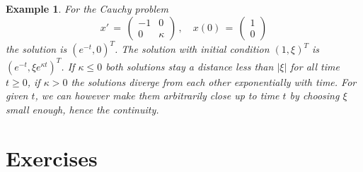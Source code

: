\documentclass[12pt]{report}
\newtheorem{example}[theorem]{Example}
\begin{document}
\begin{example}{\rm For the Cauchy problem  
\begin{equation}
x'\,=\, \left(  \begin{array}{cc}  -1 & 0 \\ 0 & \kappa   \end{array}\right) 
\,, \quad x(0)
\,=\, \left(  \begin{array}{c}  1 \\  0  \end{array}\right)
\end{equation} 
the solution is $(e^{-t}, 0)^T$. The solution with initial condition
$(1,\xi)^T$ is $(e^{-t}, \xi e^{\kappa t})^T$. If $\kappa \le 0$ both
solutions stay a distance less than $|\xi|$ for all time $t\ge 0$, if
$\kappa >0$ the solutions diverge from each other exponentially with
time. For given $t$, we can however make them arbitrarily close up to
time $t$ by choosing $\xi$ small enough, hence the continuity. }
\end{example}

\section{Exercises}
\end{document}
